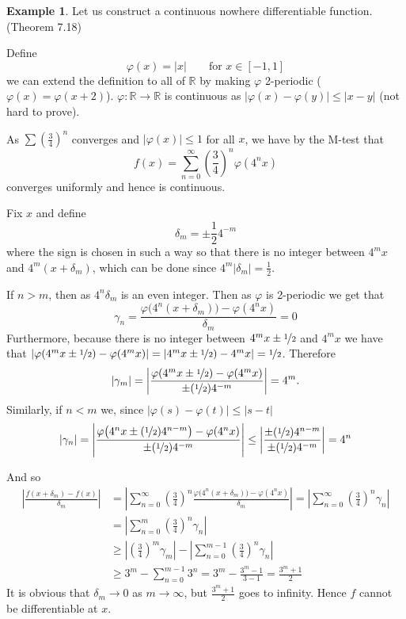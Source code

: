 \documentclass[12pt]{book}
\newcommand{\abs}[1]{\left\lvert {#1} \right\rvert}
\newcommand{\R}{{\mathbb{R}}}
\theoremstyle{plain}
\theoremstyle{remark}
\theoremstyle{definition}
\theoremstyle{exercise}
\theoremstyle{example}
\newtheorem{example}[thm]{Example}
\begin{document}
\begin{example}
Let us construct a continuous nowhere differentiable function.  (Theorem 7.18)

Define
$$
\varphi(x) =\abs{x} \qquad \text{for $x \in [-1,1]$}
$$
we can extend the definition to all of $\R$ by making $\varphi$ 2-periodic
($\varphi(x) = \varphi(x+2)$).  $\varphi \colon \R \to \R$
is continuous as $\abs{\varphi(x)-\varphi(y)} \leq \abs{x-y}$ (not hard to
prove).

As $\sum {\left(\frac{3}{4}\right)}^n$ converges and $\abs{\varphi(x)} \leq
1$ for all $x$, we have by the M-test that
\begin{equation*}
f(x) = \sum_{n=0}^\infty 
{\left(\frac{3}{4}\right)}^n \varphi(4^n x)
\end{equation*}
converges uniformly and hence is continuous.

Fix $x$ and
define
$$
\delta_m = \pm \frac{1}{2} 4^{-m}
$$
where the sign is chosen in such a way so that there is no integer
between $4^m x$ and $4^m(x+\delta_m)$, which can be done
since $4^m\abs{\delta_m} = \frac{1}{2}$.

If $n > m$, then as $4^n\delta_m$ is an even integer.  Then as $\varphi$
is 2-periodic we get that
\begin{equation*}
\gamma_n =
\frac{\varphi\bigl(4^n(x+\delta_m)\bigr)-\varphi(4^nx)}{\delta_m} = 0
\end{equation*}
Furthermore, because there is no integer between 
$4^mx\pm\nicefrac{1}{2}$ and $4^mx$ we have that
$\abs{\varphi(4^mx\pm\nicefrac{1}{2})-\varphi(4^mx)} =
\abs{4^mx\pm\nicefrac{1}{2})-4^mx} = \nicefrac{1}{2}$.  Therefore
\begin{equation*}
\abs{\gamma_m} =
\abs{
\frac{\varphi(4^mx\pm\nicefrac{1}{2})-\varphi(4^mx)}{\pm (\nicefrac{1}{2}) 4^{-m}}
}
= 4^m .
\end{equation*}
Similarly, if $n < m$ we, since $\abs{\varphi(s) -\varphi(t)} \leq \abs{s-t}$
\begin{equation*}
\abs{\gamma_n} =
\abs{\frac{\varphi\bigl(4^nx\pm(\nicefrac{1}{2})4^{n-m}\bigr)-\varphi(4^nx)}{\pm
(\nicefrac{1}{2}) 4^{-m}}}
\leq
\abs{\frac{\pm(\nicefrac{1}{2})4^{n-m}}{\pm (\nicefrac{1}{2}) 4^{-m}}} = 4^n
\end{equation*}

And so
\begin{equation*}
\begin{split}
\abs{
\frac{f(x+\delta_m)-f(x)}{\delta_m}
}
& =
\abs{
\sum_{n=0}^\infty 
{\left(\frac{3}{4}\right)}^n
\frac{\varphi\bigl(4^n(x+\delta_m)\bigr)-\varphi(4^nx)}{\delta_m}
}
=
\abs{
\sum_{n=0}^\infty 
{\left(\frac{3}{4}\right)}^n
\gamma_n
}
\\
& =
\abs{
\sum_{n=0}^m 
{\left(\frac{3}{4}\right)}^n
\gamma_n
}
\\
& \geq
\abs{
{\left(\frac{3}{4}\right)}^m
\gamma_m}
-
\abs{
\sum_{n=0}^{m-1} 
{\left(\frac{3}{4}\right)}^n
\gamma_n
}
\\
& \geq
3^m
-
\sum_{n=0}^{m-1} 
3^n
=
3^m
-
\frac{3^{m}-1}{3-1}
=
\frac{3^m +1}{2}
\end{split}
\end{equation*}
It is obvious that $\delta_m \to 0$ as $m \to \infty$, but $\frac{3^m+1}{2}$
goes to infinity.  Hence $f$ cannot be differentiable at $x$.


\end{example}
\end{document}
